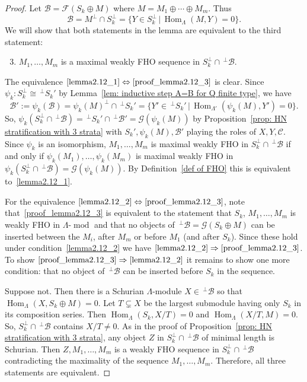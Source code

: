 \documentclass[10pt]{amsart}
\theoremstyle{definition}
\newcommand{\then}{\Rightarrow}
\DeclareMathOperator{\Hom}{Hom}%
\DeclareMathOperator{\modr}{mod}
\newcommand{\cB}{\ensuremath{{\mathcal{B}}}}
\newcommand{\cC}{\ensuremath{{\mathcal{C}}}}
\newcommand{\cF}{\ensuremath{{\mathcal{F}}}}
\newcommand{\cG}{\ensuremath{{\mathcal{G}}}}
\begin{document}
\begin{proof} Let $\cB=\cF(S_k\oplus M)$ where $M=M_1\oplus\cdots\oplus M_m$. Thus 
\[
	\cB=M^\perp\cap S_k^\perp= \{Y\in S_k^\perp\,|\, \Hom_{\Lambda}(M,Y)=0\}.
\]
We will show that both statements in the lemma are equivalent to the third statement:

\begin{enumerate}\setcounter{enumi}{2}
\item\label{proof_lemma2.12_3}  %
$M_1,\ldots,M_m$ is a maximal weakly FHO sequence in $S_k^\perp\cap\,^\perp \cB$.
\end{enumerate}


The equivalence $\eqref{lemma2.12_1}\Leftrightarrow\eqref{proof_lemma2.12_3}$ is clear. Since $\psi_k:S_k^\perp\cong \,^{\perp}S_k'$ by Lemma~\ref{lem: inductive step A=B for Q finite type}, we have
\[
	\cB':=\psi_k(\cB)=\psi_k(M)^\perp\cap \,^\perp S_k'=\{Y'\in\,^{\perp}S_k'\,|\, \Hom_{\Lambda'}(\psi_k(M),Y')=0\}.
\]
So, $\psi_k(S_k^\perp\cap\,^\perp \cB)=\,^{\perp}S_k'\cap\,^\perp\cB'=\cG(\psi_k(M))$ by Proposition~\ref{prop: HN stratification with 3 strata} with $S_k',\psi_k(M),\cB'$ playing the roles of $X,Y,\cC$. Since $\psi_k$ is an isomorphism, $M_1,\ldots,M_m$ is maximal weakly FHO in $S_k^\perp\cap\,^\perp\cB$ if and only if $\psi_k(M_1),\ldots,\psi_k(M_m)$ is maximal weakly FHO in $\psi_k(S_k^\perp\cap\,^\perp \cB)=\cG(\psi_k(M))$. By Definition~\ref{def of FHO} this is equivalent to~\eqref{lemma2.12_1}.


For the equivalence $\eqref{lemma2.12_2}\Leftrightarrow\eqref{proof_lemma2.12_3}$, note that~\eqref{proof_lemma2.12_3} is equivalent to the statement that $S_k$, $M_1,\ldots,M_m$ is weakly FHO in $\Lambda\text{-}\modr $ and that no objects of $\,^\perp\cB=\cG(S_k\oplus M)$ can be inserted between the $M_i$, after $M_m$ or before $M_1$ (and after $S_k$). Since these hold under condition~\eqref{lemma2.12_2} we have $\eqref{lemma2.12_2}\then \eqref{proof_lemma2.12_3}$. To show $\eqref{proof_lemma2.12_3}\then \eqref{lemma2.12_2}$ it remains to show one more condition: that no object of $\,^\perp\cB$ can be inserted before $S_k$ in the sequence.

Suppose not. Then there is a Schurian $\Lambda$-module $X\in\,^\perp\cB$ so that $\Hom_\Lambda(X,S_k\oplus M)=0$. Let $T\subsetneq X$ be the largest submodule having only $S_k$ in its composition series. Then $\Hom_\Lambda(S_k,X/T)=0$ and $\Hom_\Lambda(X/T,M)=0$. So, $S_k^\perp\cap\,^\perp\cB$ contains $X/T\neq0$. As in the proof of Proposition~\ref{prop: HN stratification with 3 strata}, any object $Z$ in $S_k^\perp\cap\,^\perp\cB$ of minimal length is Schurian. Then $Z,M_1,\ldots,M_m$ is a weakly FHO sequence in $S_k^\perp\cap\,^\perp \cB$ contradicting the maximality of the sequence $M_1,\ldots,M_m$. Therefore, all three statements are equivalent.
\end{proof}
\end{document}
